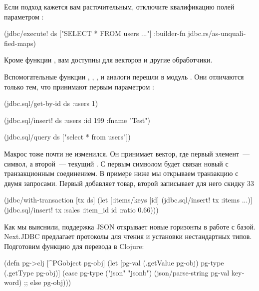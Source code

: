 Если подход кажется вам расточительным, отключите квалификацию полей параметром :

\begin{english}
  \begin{clojure}
(jdbc/execute!
 ds
 ["SELECT * FROM users ..."]
 {:builder-fn jdbc.rs/as-unqualified-maps})
  \end{clojure}
\end{english}

Кроме функции , вам доступны  для векторов и другие обработчики.

Вспомогательные функции , , ,  и аналоги перешли в модуль . Они отличаются только тем, что принимают первым параметром :

\begin{english}
  \begin{clojure}
(jdbc.sql/get-by-id ds :users 1)

(jdbc.sql/insert! ds :users {:id 199 :fname "Test"})

(jdbc.sql/query ds ["select * from users"])
  \end{clojure}
\end{english}

Макрос  тоже почти не изменился. Он принимает вектор, где первый элемент~--- символ, а второй~--- текущий . С первым символом будет связан новый  с транзакционным соединением. В примере ниже мы открываем транзакцию с двумя запросами. Первый добавляет товар, второй записывает для него скидку 33%

\begin{english}
  \begin{clojure}
(jdbc/with-transaction [tx ds]
  (let [{:items/keys [id]}
        (jdbc.sql/insert! tx :items {...})]
    (jdbc.sql/insert!
       tx
       :sales
       {:item_id id :ratio 0.66})))
  \end{clojure}
\end{english}

Как мы выяснили, поддержка JSON открывает новые горизонты в работе с базой. Next.JDBC предлагает протоколы для чтения и установки нестандартных типов. Подготовим функцию для перевода  в Clojure:

\begin{english}
  \begin{clojure}
(defn pg->clj [^PGobject pg-obj]
  (let [pg-val (.getValue pg-obj)
        pg-type (.getType pg-obj)]
    (case pg-type
      ("json" "jsonb")
      (json/parse-string pg-val keyword)
      ;; else
      pg-obj)))
  \end{clojure}
\end{english}

